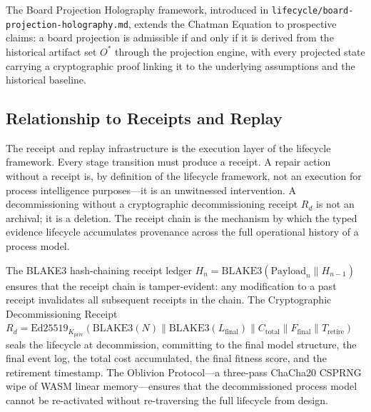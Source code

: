 The Board Projection Holography framework, introduced in
\texttt{lifecycle/board-projection-holography.md}, extends the Chatman Equation to
prospective claims: a board projection is admissible if and only if it is derived from
the historical artifact set $O^*$ through the projection engine, with every projected
state carrying a cryptographic proof linking it to the underlying assumptions and the
historical baseline.

\subsection{Relationship to Receipts and Replay}
\label{sec:lifecycle-lineage-receipts}

The receipt and replay infrastructure is the execution layer of the lifecycle framework.
Every stage transition must produce a receipt. A repair action without a receipt is, by
definition of the lifecycle framework, not an execution for process intelligence
purposes---it is an unwitnessed intervention. A decommissioning without a cryptographic
decommissioning receipt $R_d$ is not an archival; it is a deletion. The receipt chain
is the mechanism by which the typed evidence lifecycle accumulates provenance across the
full operational history of a process model.

The BLAKE3 hash-chaining receipt ledger $H_n = \mathrm{BLAKE3}(\mathrm{Payload}_n
\parallel H_{n-1})$ ensures that the receipt chain is tamper-evident: any modification
to a past receipt invalidates all subsequent receipts in the chain. The Cryptographic
Decommissioning Receipt $R_d = \mathrm{Ed25519}_{K_{\mathrm{priv}}}(\mathrm{BLAKE3}(N)
\parallel \mathrm{BLAKE3}(L_{\mathrm{final}}) \parallel C_{\mathrm{total}} \parallel
F_{\mathrm{final}} \parallel T_{\mathrm{retire}})$ seals the lifecycle at decommission,
committing to the final model structure, the final event log, the total cost accumulated,
the final fitness score, and the retirement timestamp. The Oblivion Protocol---a
three-pass ChaCha20 CSPRNG wipe of WASM linear memory---ensures that the decommissioned
process model cannot be re-activated without re-traversing the full lifecycle from design.
